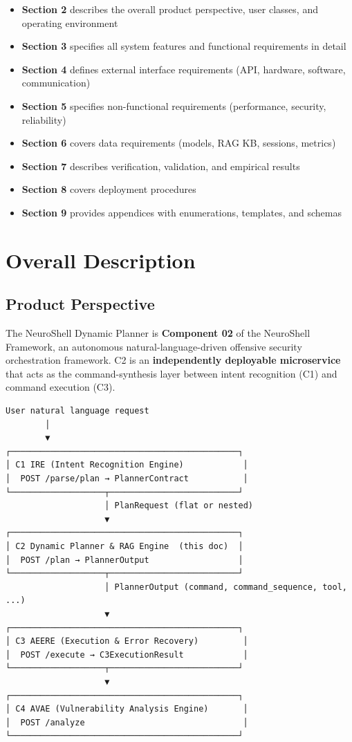 \documentclass[10pt,journal,onecolumn]{IEEEtran}
\begin{document}
\begin{itemize}
\item \textbf{Section 2} describes the overall product perspective, user classes, and operating environment
\item \textbf{Section 3} specifies all system features and functional requirements in detail
\item \textbf{Section 4} defines external interface requirements (API, hardware, software, communication)
\item \textbf{Section 5} specifies non-functional requirements (performance, security, reliability)
\item \textbf{Section 6} covers data requirements (models, RAG KB, sessions, metrics)
\item \textbf{Section 7} describes verification, validation, and empirical results
\item \textbf{Section 8} covers deployment procedures
\item \textbf{Section 9} provides appendices with enumerations, templates, and schemas
\end{itemize}

\section{Overall Description}

\subsection{Product Perspective}

The NeuroShell Dynamic Planner is \textbf{Component 02} of the NeuroShell Framework, an autonomous natural-language-driven offensive security orchestration framework. C2 is an \textbf{independently deployable microservice} that acts as the command-synthesis layer between intent recognition (C1) and command execution (C3).

\begin{lstlisting}
User natural language request
        │
        ▼
┌──────────────────────────────────────────────┐
│ C1 IRE (Intent Recognition Engine)            │
│  POST /parse/plan → PlannerContract           │
└───────────────────┬──────────────────────────┘
                    │ PlanRequest (flat or nested)
                    ▼
┌──────────────────────────────────────────────┐
│ C2 Dynamic Planner & RAG Engine  (this doc)  │
│  POST /plan → PlannerOutput                  │
└───────────────────┬──────────────────────────┘
                    │ PlannerOutput (command, command_sequence, tool, ...)
                    ▼
┌──────────────────────────────────────────────┐
│ C3 AEERE (Execution & Error Recovery)         │
│  POST /execute → C3ExecutionResult            │
└───────────────────┬──────────────────────────┘
                    ▼
┌──────────────────────────────────────────────┐
│ C4 AVAE (Vulnerability Analysis Engine)       │
│  POST /analyze                                │
└──────────────────────────────────────────────┘
\end{lstlisting}
\end{document}
